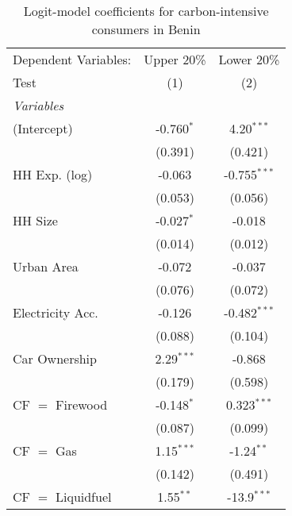 
\begin{table}[htbp!]
   \centering
   \small
   \begin{adjustbox}{width = 1\textwidth, max height = 0.95\textheight, center}
      \begin{threeparttable}[b]
         \caption{\label{tab:Logit_1_BEN} Logit-model coefficients for carbon-intensive consumers in Benin}
         \begin{tabular}{lcc}
            \tabularnewline \midrule \midrule
            Dependent Variables: & Upper 20\%    & Lower 20\%\\   
            Test                 & (1)           & (2)\\  
            \midrule
            \emph{Variables}\\
            (Intercept)          & -0.760$^{*}$  & 4.20$^{***}$\\   
                                 & (0.391)       & (0.421)\\   
            HH Exp. (log)        & -0.063        & -0.755$^{***}$\\   
                                 & (0.053)       & (0.056)\\   
            HH Size              & -0.027$^{*}$  & -0.018\\   
                                 & (0.014)       & (0.012)\\   
            Urban Area           & -0.072        & -0.037\\   
                                 & (0.076)       & (0.072)\\   
            Electricity Acc.     & -0.126        & -0.482$^{***}$\\   
                                 & (0.088)       & (0.104)\\   
            Car Ownership        & 2.29$^{***}$  & -0.868\\   
                                 & (0.179)       & (0.598)\\   
            CF $=$ Firewood      & -0.148$^{*}$  & 0.323$^{***}$\\   
                                 & (0.087)       & (0.099)\\   
            CF $=$ Gas           & 1.15$^{***}$  & -1.24$^{**}$\\   
                                 & (0.142)       & (0.491)\\   
            CF $=$ Liquidfuel    & 1.55$^{**}$   & -13.9$^{***}$\\   

\end{tabular}
\end{threeparttable}
\end{adjustbox}
\end{table}
